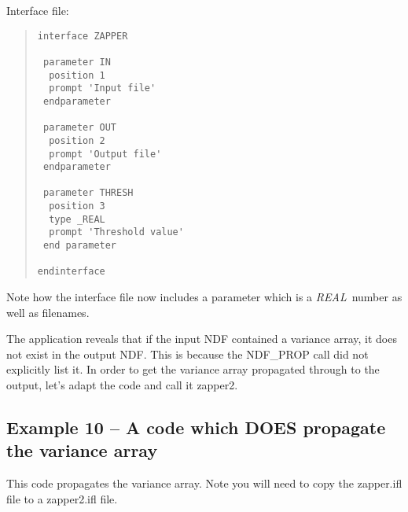 Interface file:

\begin{quote}
{\small
\begin{verbatim}
interface ZAPPER

 parameter IN
  position 1
  prompt 'Input file'
 endparameter

 parameter OUT
  position 2
  prompt 'Output file'
 endparameter

 parameter THRESH
  position 3
  type _REAL
  prompt 'Threshold value'
 end parameter
 
endinterface
\end{verbatim}
}
\end{quote}

Note how the interface file now includes a parameter which is a {\em REAL}\,
number as well as filenames.

The  application
reveals that if the input NDF contained a variance array, it does not
exist in the output NDF. This is because the 
{\sf NDF\_PROP} call did
not explicitly list it. In order to get the variance array propagated
through to the output, let's adapt the code and call it {\sf zapper2}. 

\subsection{Example 10 -- A code which DOES propagate the variance array}

This code propagates the variance array. Note you will need to copy the
{\sf zapper.ifl} file to a {\sf zapper2.ifl} file.

